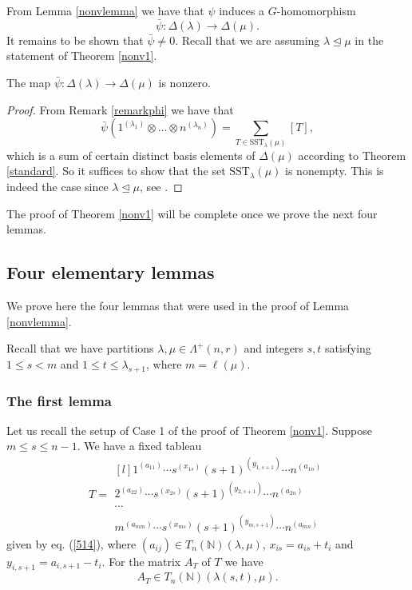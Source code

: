 \documentclass[ALCO,Unicode]{cedram}
\newcommand{\la}{\lambda}
\numberwithin{equation}{section}
\begin{document}
	From Lemma \ref{nonvlemma} we have that $\psi$ induces a $G$-homomorphism \[\bar{\psi} : \Delta(\lambda) \to \Delta(\mu).\] It remains to be shown that $\bar{\psi} \neq 0$. Recall that we are assuming $\lambda \unlhd \mu$ in the statement of Theorem \ref{nonv1}.
	
	\begin{lemma}\label{nonvlemma2}
	The map $\bar{\psi} : \Delta(\lambda) \to \Delta(\mu)$ is nonzero.
	\end{lemma}
	\begin{proof}From Remark \ref{remarkphi} we have that \[\bar{\psi}(1^{(\lambda_1)} \otimes \dots \otimes n^{(\lambda_n)})=\sum_{T \in \mathrm{SST}_{\la}(\mu)}[T],\] which is a sum of certain distinct basis elements of $\Delta{(\mu)}$ according to Theorem \ref{standard}. So it suffices to show that the set $\mathrm{SST}_{\la}(\mu)$ is nonempty. This is indeed the case since $\lambda \unlhd \mu$,  see \cite[Theorem 1'']{Lam}. \end{proof}
	
	The proof of Theorem \ref{nonv1} will be complete once we prove the next four lemmas.
	
	\subsection{Four elementary lemmas}\label{ellemmas}We prove here the four  lemmas that were used in the proof of Lemma \ref{nonvlemma}. 
	
	Recall that we have partitions $\lambda, \mu \in \Lambda^+(n,r)$ and integers $s,t$ satisfying $1 \le s < m$ and $1 \le t \le \lambda_{s+1}$, where $m=\ell(\mu)$. 

	\subsubsection{The first lemma}Let us recall the setup of Case 1 of the proof of Theorem \ref{nonv1}. Suppose $m \le s\le n-1$. We have a fixed tableau \begin{equation}\label{lem611}T=\begin{matrix*}[l]
			1^{(a_{11})} \cdots s^{(x_{1s})}(s+1)^{(y_{1,s+1})} \cdots n^{(a_{1n})} \\
			2^{(a_{22})} \cdots s^{(x_{2s})}(s+1)^{(y_{2,s+1})} \cdots n^{(a_{2n})} \\
			\cdots \\ 
			m^{(a_{mm})}\cdots s^{(x_{ms})}(s+1)^{(y_{m,s+1})} \cdots n^{(a_{mn})}   \end{matrix*}\end{equation} given by eq. (\ref{514}), where $(a_{ij}) \in T_n(\mathbb{N})(\la, \mu)$, $x_{is}=a_{is}+t_i$ and $y_{i,s+1}=a_{i,s+1}-t_i$. For the matrix $A_T$ of $T$ we have \begin{equation}\label{lem612}
		A_T \in T_n(\mathbb{N})(\la(s,t), \mu).
	\end{equation}
	
\end{document}
